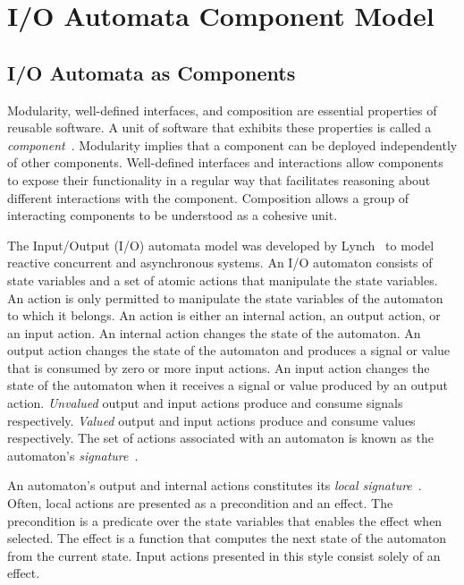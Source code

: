 \section{I/O Automata Component Model\label{system_model}}

\subsection{I/O Automata as Components}

Modularity, well-defined interfaces, and composition are essential properties of reusable software.
A unit of software that exhibits these properties is called a \emph{component}~\cite{szyperski2002component}.
Modularity implies that a component can be deployed independently of other components.
Well-defined interfaces and interactions allow components to expose their functionality in a regular way that facilitates reasoning about different interactions with the component.
Composition allows a group of interacting components to be understood as a cohesive unit.

The Input/Output (I/O) automata model was developed by Lynch~\cite{lynch1996distributed} to model reactive concurrent and asynchronous systems.
An I/O automaton consists of state variables and a set of atomic actions that manipulate the state variables.
An action is only permitted to manipulate the state variables of the automaton to which it belongs.
An action is either an internal action, an output action, or an input action.
An internal action changes the state of the automaton.
An output action changes the state of the automaton and produces a signal or value that is consumed by zero or more input actions.
An input action changes the state of the automaton when it receives a signal or value produced by an output action.
\emph{Unvalued} output and input actions produce and consume signals respectively.
\emph{Valued} output and input actions produce and consume values respectively.
The set of actions associated with an automaton is known as the automaton's \emph{signature}~\cite{lynch1996distributed}.

An automaton's output and internal actions constitutes its \emph{local signature}~\cite{lynch1996distributed}.
Often, local actions are presented as a precondition and an effect.
The precondition is a predicate over the state variables that enables the effect when selected.
The effect is a function that computes the next state of the automaton from the current state.
Input actions presented in this style consist solely of an effect.

